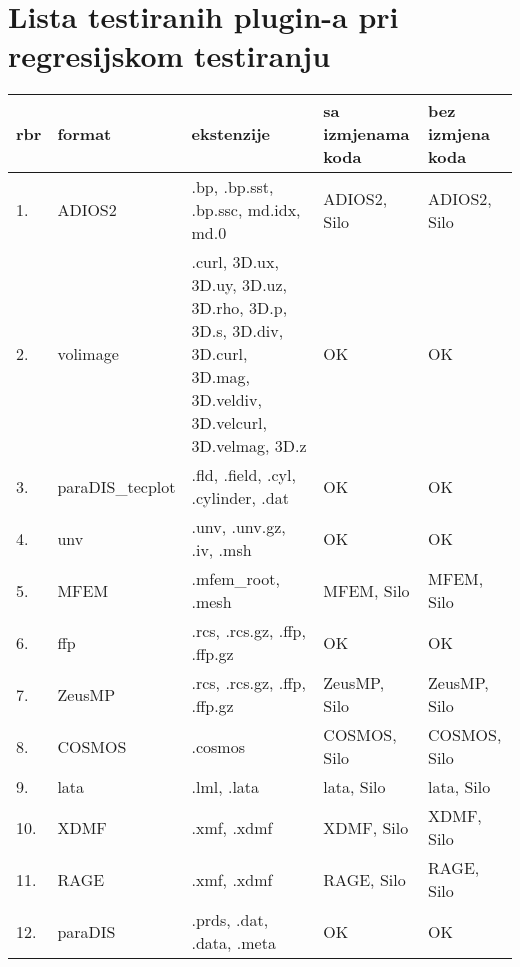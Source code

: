 \documentclass[times, utf8, zavrsni]{fer}
\begin{document}
\appendix
\chapter{Lista testiranih plugin-a pri regresijskom testiranju}
\begin{longtable}{|l|p{70pt}|p{100pt}|p{100pt}| p{100pt}|}
	\hline
	\textbf{rbr} & \textbf{format} & \textbf{ekstenzije} & \textbf{sa izmjenama koda} & \textbf{bez izmjena koda}\\
	\hline
	\endhead %
	1. & ADIOS2 & .bp, .bp.sst, .bp.ssc, md.idx, md.0 & \cellcolor{yellow} ADIOS2, Silo & \cellcolor{yellow} ADIOS2, Silo\\
	\hline
	2. & volimage & .curl, 3D.ux, 3D.uy, 3D.uz, 3D.rho, 3D.p, 3D.s, 3D.div, 3D.curl, 3D.mag, 3D.veldiv, 3D.velcurl, 3D.velmag, 3D.z & \cellcolor{green} OK & \cellcolor{green}OK\\
	\hline
	3. & paraDIS\_tecplot & .fld, .field, .cyl, .cylinder, .dat & \cellcolor{green} OK & \cellcolor{green} OK\\
	\hline
	4. & unv & .unv, .unv.gz, .iv, .msh & \cellcolor{green} OK & \cellcolor{green} OK\\
	\hline
	5. & MFEM & .mfem\_root, .mesh & \cellcolor{yellow} MFEM, Silo & \cellcolor{yellow} MFEM, Silo\\
	\hline
	6. & ffp & .rcs, .rcs.gz, .ffp, .ffp.gz & \cellcolor{green} OK & \cellcolor{green} OK\\
	\hline
	7. & ZeusMP & .rcs, .rcs.gz, .ffp, .ffp.gz & \cellcolor{yellow} ZeusMP, Silo & \cellcolor{yellow} ZeusMP, Silo\\
	\hline
	8. & COSMOS & .cosmos & \cellcolor{yellow} COSMOS, Silo & \cellcolor{yellow} COSMOS, Silo\\
	\hline
	\hline
	9. & lata & .lml, .lata & \cellcolor{yellow} lata, Silo & \cellcolor{yellow} lata, Silo\\
	\hline
	10. & XDMF & .xmf, .xdmf & \cellcolor{yellow} XDMF, Silo & \cellcolor{yellow} XDMF, Silo\\
	\hline
	11. & RAGE & .xmf, .xdmf & \cellcolor{yellow} RAGE, Silo & \cellcolor{yellow} RAGE, Silo\\
	\hline
	12. & paraDIS & .prds, .dat, .data, .meta & \cellcolor{green} OK & \cellcolor{green} OK \\
	\hline
\end{longtable}
\end{document}
